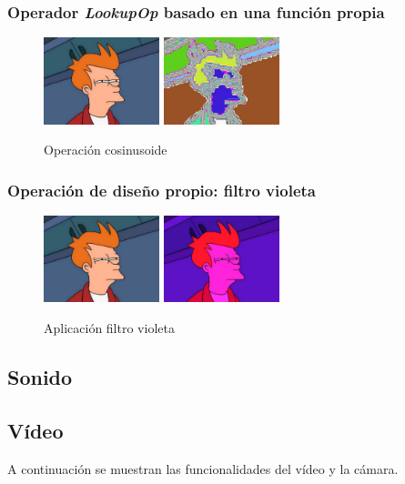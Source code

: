 \subsubsection{Operador \textit{LookupOp} basado en una función propia}
\vskip0.3cm
\begin{figure}[H]
 \centering
  \includegraphics[width=0.3\textwidth]{imagenes/Fry.jpg}
  \includegraphics[width=0.3\textwidth]{imagenes/fryCos.jpg}
 \caption{Operación cosinusoide}
 \label{diseño}
 \end{figure}
\subsubsection{Operación de diseño propio: filtro violeta}
\vskip0.3cm
\begin{figure}[H]
 \centering
  \includegraphics[width=0.3\textwidth]{imagenes/Fry.jpg}
  \includegraphics[width=0.3\textwidth]{imagenes/fryVioleta.jpg}
 \caption{Aplicación filtro violeta}
 \label{diseño}
 \end{figure}
\subsection{Sonido}
\subsection{Vídeo}
A continuación se muestran las funcionalidades del vídeo y la cámara.
